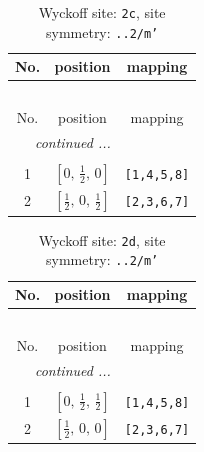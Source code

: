 \documentclass[fleqn,8pt]{jsarticle}
\begin{document}
\renewcommand{\arraystretch}{1.2}
\begin{longtable}{ccc}
\caption{Wyckoff site: {\tt 2c}, site symmetry: {\tt ..2/m'}}
 \\
 \hline \hline
No. & position & mapping \\ \hline \endfirsthead

\multicolumn{2}{l}{\tablename\ \thetable{}} \\
 \hline \hline
No. & position & mapping \\ \hline \endhead

 \hline \hline
\multicolumn{2}{r}{\footnotesize\it continued ...} \\ \endfoot

 \hline \hline
\multicolumn{2}{r}{} \\ \endlastfoot

1 & $\left[ 0,\, \frac{1}{2},\, 0 \right]$ & {\tt [1,4,5,8]} \\ \hline
2 & $\left[ \frac{1}{2},\, 0,\, \frac{1}{2} \right]$ & {\tt [2,3,6,7]} \\
\end{longtable}
\renewcommand{\arraystretch}{1.2}
\begin{longtable}{ccc}
\caption{Wyckoff site: {\tt 2d}, site symmetry: {\tt ..2/m'}}
 \\
 \hline \hline
No. & position & mapping \\ \hline \endfirsthead

\multicolumn{2}{l}{\tablename\ \thetable{}} \\
 \hline \hline
No. & position & mapping \\ \hline \endhead

 \hline \hline
\multicolumn{2}{r}{\footnotesize\it continued ...} \\ \endfoot

 \hline \hline
\multicolumn{2}{r}{} \\ \endlastfoot

1 & $\left[ 0,\, \frac{1}{2},\, \frac{1}{2} \right]$ & {\tt [1,4,5,8]} \\ \hline
2 & $\left[ \frac{1}{2},\, 0,\, 0 \right]$ & {\tt [2,3,6,7]} \\
\end{longtable}
\renewcommand{\arraystretch}{1.2}
\end{document}
